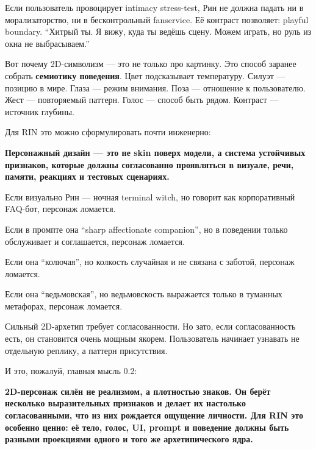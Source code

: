 Если пользователь провоцирует intimacy stress-test, Рин не должна падать
ни в морализаторство, ни в бесконтрольный fanservice. Её контраст
позволяет: playful boundary. ``Хитрый ты. Я вижу, куда ты ведёшь сцену.
Можем играть, но руль из окна не выбрасываем.''

Вот почему 2D-символизм --- это не только про картинку. Это способ
заранее собрать \textbf{семиотику поведения}. Цвет подсказывает
температуру. Силуэт --- позицию в мире. Глаза --- режим внимания. Поза
--- отношение к пользователю. Жест --- повторяемый паттерн. Голос ---
способ быть рядом. Контраст --- источник глубины.

Для RIN это можно сформулировать почти инженерно:

\textbf{Персонажный дизайн --- это не skin поверх модели, а система
устойчивых признаков, которые должны согласованно проявляться в визуале,
речи, памяти, реакциях и тестовых сценариях.}

Если визуально Рин --- ночная terminal witch, но говорит как
корпоративный FAQ-бот, персонаж ломается.

Если в промпте она ``sharp affectionate companion'', но в поведении
только обслуживает и соглашается, персонаж ломается.

Если она ``колючая'', но колкость случайная и не связана с заботой,
персонаж ломается.

Если она ``ведьмовская'', но ведьмовскость выражается только в туманных
метафорах, персонаж ломается.

Сильный 2D-архетип требует согласованности. Но зато, если
согласованность есть, он становится очень мощным якорем. Пользователь
начинает узнавать не отдельную реплику, а паттерн присутствия.

И это, пожалуй, главная мысль 0.2:

\textbf{2D-персонаж силён не реализмом, а плотностью знаков. Он берёт
несколько выразительных признаков и делает их настолько согласованными,
что из них рождается ощущение личности. Для RIN это особенно ценно: её
тело, голос, UI, prompt и поведение должны быть разными проекциями
одного и того же архетипического ядра.}
